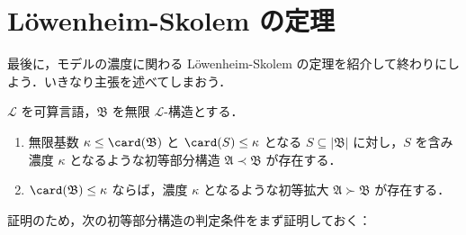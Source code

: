 \documentclass[a4j,xelatex,ja=standard]{ltjsarticle}
\begin{document}
\section{L\"{o}wenheim-Skolem の定理}
最後に，モデルの濃度に関わる L\"{o}wenheim-Skolem の定理を紹介して終わりにしよう．いきなり主張を述べてしまおう．

\begin{theorem}
 $\mathcal{L}$ を可算言語，$\mathfrak{B}$ を無限 $\mathcal{L}$-構造とする．
 \begin{enumerate}[label=(\alph{*})]
  \item 無限基数 $\kappa \leq \card(\mathfrak{B})$ と $\card(S) \leq \kappa$ となる $S \subseteq |\mathfrak{B}|$ に対し，$S$ を含み濃度 $\kappa$ となるような初等部分構造 $\mathfrak{A} \prec \mathfrak{B}$ が存在する．
  \item $\card(\mathfrak{B}) \leq \kappa$ ならば，濃度 $\kappa$ となるような初等拡大 $\mathfrak{A} \succ \mathfrak{B}$ が存在する．
 \end{enumerate}
\end{theorem}

証明のため，次の初等部分構造の判定条件をまず証明しておく：
\end{document}
